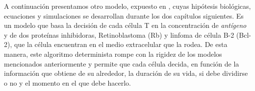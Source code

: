 A continuación presentamos otro modelo, expuesto en \cite{JTB}, cuyas hipótesis biológicas, ecuaciones y simulaciones se desarrollan durante los dos capítulos siguientes. Es un modelo que basa la decisión de cada célula T en la concentración de \textit{antígeno} y de dos proteínas inhibidoras, Retinoblastoma (Rb) y linfoma de célula B-2 (Bcl-2), que la célula encuentran en el medio extracelular que la rodea. De esta manera, este algoritmo determinista rompe con la rigidez de los modelos mencionados anteriormente y permite que cada célula decida, en función de la información que obtiene de su alrededor, la duración de su vida, si debe dividirse o no y el momento en el que debe hacerlo. 


